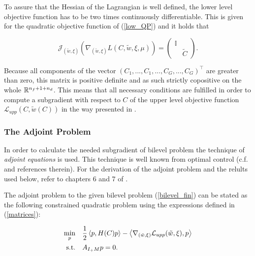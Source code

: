 To assure that the Hessian of the Lagrangian is well defined, the lower level objective function has to be two times continuously differentiable. This is given for the quadratic objective function of (\ref{low_QP}) and it holds that 

\[\mathcal{J}_{(\tilde{w},\xi)}\left(\nabla_{(\tilde{w},\xi)}L(C,\tilde{w},\xi,\mu)\right) = \begin{pmatrix} \mathbb{I} \\ & \tilde{C}\end{pmatrix}. \] 

Because all components of the vector \((C_1,...,C_1,...,C_G,...,C_G)^{\top}\) are greater than zero, this matrix is positive definite and as such strictly copositive on the whole \(\mathbb{R}^{n_f+1+n_d}\).
This means that all necessary conditions are fulfilled in order to compute a subgradient with respect to \(C\) of the upper level objective function \(\mathcal{L}_{upp}(C,\tilde{w}(C))\) in the way presented in \cite{Outrata1998}.

\subsubsection{The Adjoint Problem}

In order to calculate the needed subgradient of bilevel problem the technique of \emph{adjoint equations} is used. This technique is well known from optimal control (c.f. \cite[p. 126]{Outrata1998} and references therein). For the derivation of the adjoint problem and the relults used below, refer to chapters 6 and 7 of \cite{Outrata1998}. 

The adjoint problem to the given bilevel problem (\ref{bilevel_fin}) can be stated as the following constrained quadratic problem using the expressions defined in (\ref{matrices}):

\begin{equation}
\begin{split}
	\min_{p} & \quad\frac{1}{2}\left\langle p,H(C)p\right\rangle - \left\langle \nabla_{(\tilde{w},\xi)} \mathcal{L}_{upp}(\tilde{w},\xi),p\right\rangle \\
	\text{s.t.} & \quad A_{I_+M}p = 0.
\end{split}
\label{adj_prob}
\end{equation}

